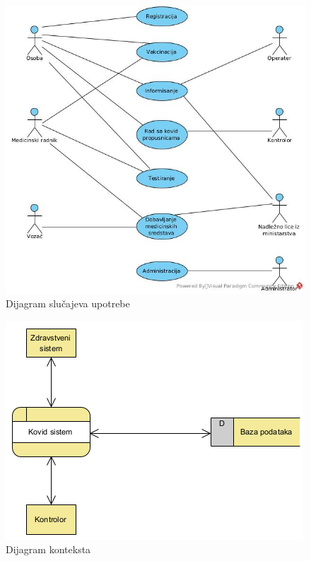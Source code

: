 \documentclass[titlepage]{article}
\begin{document}
\begin{figure}[H]
\centering
\includegraphics[scale=0.6]{Dijagram_slucajeva_upotrebe}
\caption{Dijagram slučajeva upotrebe}
\label{slk:slucajevi}
\end{figure}

\begin{figure}[H]
\centering
\includegraphics[scale=0.6]{Dijagram_konteksta}
\caption{Dijagram konteksta}
\label{slk:kontekst}
\end{figure}
\end{document}
